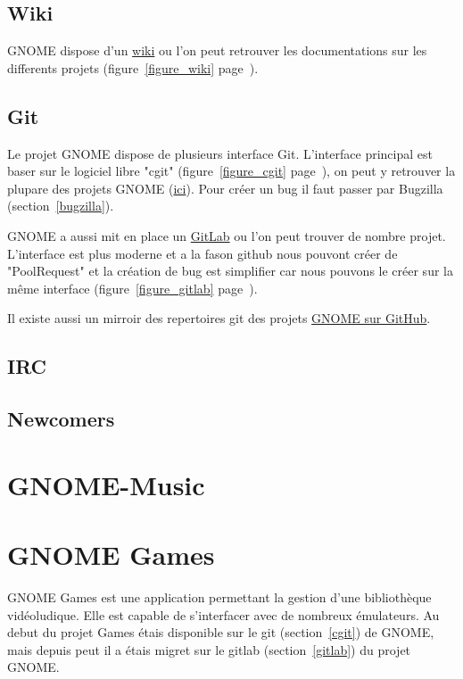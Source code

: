 \documentclass[12pt]{report}
\begin{document}
\subsection{Wiki}
\label{wiki}
GNOME dispose d'un \href{https://wiki.gnome.org/}{wiki} ou l'on peut retrouver 
les documentations sur les differents projets (figure~\ref{figure_wiki} page~\pageref{figure_wiki}).

\subsection{Git}
\label{git}
\label{cgit}
Le projet GNOME dispose de plusieurs interface Git. L'interface 
principal est baser sur le logiciel libre "cgit" (figure~\ref{figure_cgit} 
page~\pageref{figure_cgit}), on peut y retrouver la plupare des projets GNOME 
(\href{https://git.gnome.org/}{ici}). Pour créer un bug il faut passer par Bugzilla (section~\ref{bugzilla}).

\label{gitlab}
GNOME a aussi mit en place un \href{https://gitlab.gnome.org/GNOME}{GitLab} 
ou l'on peut trouver de nombre projet. L'interface est plus moderne 
et a la fason github nous pouvont créer de "PoolRequest" et la création 
de bug est simplifier car nous pouvons le créer sur la même interface 
(figure~\ref{figure_gitlab} page~\pageref{figure_gitlab}).

\label{github}
Il existe aussi un mirroir des repertoires git des projets 
\href{https://github.com/GNOME}{GNOME sur GitHub}.

\subsection{IRC}

\subsection{Newcomers}

\newpage
\section{GNOME-Music}

\newpage
\section{GNOME Games}
GNOME Games est une application permettant la gestion d'une
bibliothèque vidéoludique. Elle est capable de s'interfacer avec de
nombreux émulateurs.
Au debut du projet Games étais disponible sur le git (section~\ref{cgit}) de GNOME, mais 
depuis peut il a étais migret sur le gitlab (section~\ref{gitlab}) du projet GNOME.
\end{document}
